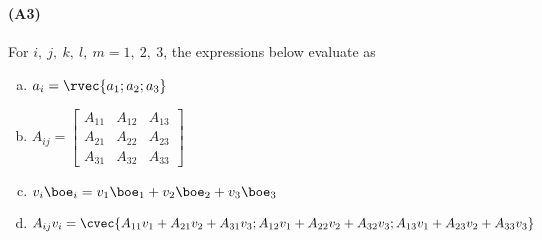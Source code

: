 \documentclass[a4paper,twosided,11pt,DIV15]{scrartcl}
\begin{document}
\paragraph{(A3)}
For $i,\ j,\ k,\ l,\ m = 1,\ 2,\ 3$, the expressions below evaluate as
\begin{enumerate}[(a)]
\item $a_i = \rvec{a_1;a_2;a_3}$
\item $A_{ij}=\begin{bmatrix}A_{11}&A_{12}&A_{13}\\A_{21}&A_{22}&A_{23}\\A_{31}&A_{32}&A_{33}\end{bmatrix}$
\item $v_i\boe_i=v_1\boe_1+v_2\boe_2+v_3\boe_3$

\item $A_{ij}v_i = \cvec{A_{11}v_1+A_{21}v_2+A_{31}v_3;A_{12}v_1+A_{22}v_2+A_{32}v_3;A_{13}v_1+A_{23}v_2+A_{33}v_3}$


\end{enumerate}
\end{document}
